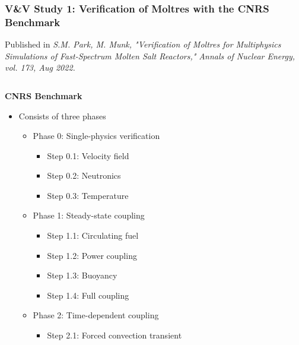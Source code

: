 \begin{frame}[noframenumbering]
  \frametitle{V\&V Study 1: Verification of Moltres with the CNRS Benchmark}

  Published in \textit{S.M. Park, M. Munk, "Verification of Moltres for Multiphysics Simulations of
    Fast-Spectrum Molten Salt Reactors," Annals of Nuclear Energy, vol. 173, Aug 2022.}

  \begin{columns}
    \column[t]{6.5cm}
    \begin{block}{\textbf{CNRS Benchmark \cite{tiberga_results_2020}}}
      \begin{itemize}
        \item Consists of three phases
          \begin{itemize}
            \item Phase 0: Single-physics verification
              \begin{itemize}
                \item Step 0.1: Velocity field
                \item Step 0.2: Neutronics
                \item Step 0.3: Temperature
              \end{itemize}
            \item Phase 1: Steady-state coupling
              \begin{itemize}
                \item Step 1.1: Circulating fuel
                \item Step 1.2: Power coupling
                \item Step 1.3: Buoyancy
                \item Step 1.4: Full coupling
              \end{itemize}
            \item Phase 2: Time-dependent coupling
              \begin{itemize}
                \item Step 2.1: Forced convection transient
              \end{itemize}
          \end{itemize}
      \end{itemize}
    \end{block}
    \column[t]{3.5cm}
    \begin{figure}
      \centering

\end{figure}
\end{columns}
\end{frame}

